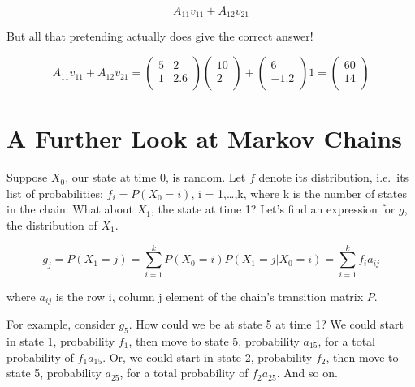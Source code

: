 \documentclass[
  letterpaper,
  DIV=11,
  numbers=noendperiod,
  oneside]{scrreprt}
\begin{document}
\[
A_{11} v_{11} + A_{12} v_{21}
\]

But all that pretending actually does give the correct answer!

\[
A_{11} v_{11} + A_{12} v_{21} =
 \left (
 \begin{array}{rr}
 5 & 2 \\
 1 & 2.6 \\
 \end{array}
 \right ) 
 \left (
 \begin{array}{rr}
 10 \\
 2 \\
 \end{array}
 \right )
+
 \left (
 \begin{array}{rr}
 6 \\
 -1.2 \\
 \end{array}
 \right )
1 
=
 \left (
 \begin{array}{rr}
 60 \\
 14 \\
 \end{array}
 \right )
\]


\hypertarget{a-further-look-at-markov-chains}{%
\chapter{A Further Look at Markov
Chains}\label{a-further-look-at-markov-chains}}

Suppose \(X_0\), our state at time 0, is random. Let \(f\) denote its
distribution, i.e.~its list of probabilities: \(f_i = P(X_0 = i)\), i =
1,\ldots,k, where k is the number of states in the chain. What about
\(X_1\), the state at time 1? Let's find an expression for \(g\), the
distribution of \(X_1\).{}

\[
g_j = P(X_1 = j)
= \sum_{i=1}^k P(X_0 = i) P(X_1 = j | X_0 = i)
= \sum_{i=1}^k f_i a_{ij}
\]

where \(a_{ij}\) is the row i, column j element of the chain's
transition matrix \(P\).

For example, consider \(g_5\). How could we be at state 5 at time 1? We
could start in state 1, probability \(f_1\), then move to state 5,
probability \(a_{15}\), for a total probability of \(f_1 a_{15}\). Or,
we could start in state 2, probability \(f_2\), then move to state 5,
probability \(a_{25}\), for a total probability of \(f_2 a_{25}\). And
so on.
\end{document}
